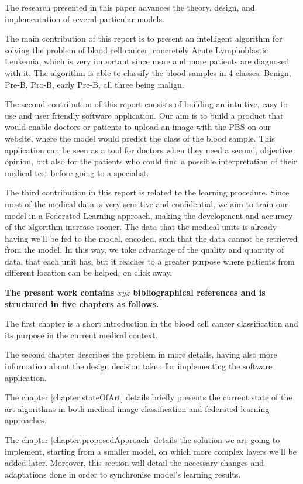 \documentclass[runningheads,a4paper,11pt]{report}
\begin{document}
The research presented in this paper advances the theory, design, and implementation of several particular models. 

The main contribution of this report is to present an intelligent algorithm for solving the problem of blood cell cancer, concretely Acute Lymphoblastic Leukemia, which is very important since more and more patients are diagnosed with it. The algorithm is able to classify the blood samples in 4 classes: Benign, Pre-B, Pro-B, early Pre-B, all three being malign.

The second contribution of this report consists of building an intuitive, easy-to-use and user friendly software application. Our aim is to build a product that would enable doctors or patients to upload an image with the PBS on our website, where the model would predict the class of the blood sample. This application can be seen as a tool for doctors when they need a second, objective opinion, but also for the patients who could find a possible interpretation of their medical test before going to a specialist.

The third contribution in this report is related to the learning procedure. Since most of the medical data is very sensitive and confidential, we aim to train our model in a Federated Learning approach, making the development and accuracy of the algorithm increase sooner. The data that the medical units is already having we'll be fed to the model, encoded, such that the data cannot be retrieved from the model. In this way, we take advantage of the quality and quantity of data, that each unit has, but it reaches to a greater purpose where patients from different location can be helped, on click away.

\textbf{The present work contains $xyz$ bibliographical references and is structured in five chapters as follows.}

The first chapter is a short introduction in the blood cell cancer classification and its purpose in the current medical context.

The second chapter describes the problem in more details, having also more information about the design decision taken for implementing the software application.

The chapter \ref{chapter:stateOfArt} details briefly presents the current state of the art algorithms in both medical image classification and federated learning approaches.

The chapter \ref{chapter:proposedApproach} details the solution we are going to implement, starting from a smaller model, on which more complex layers we'll be added later. Moreover, this section will detail the necessary changes and adaptations done in order to synchronise model's learning results.
\end{document}
